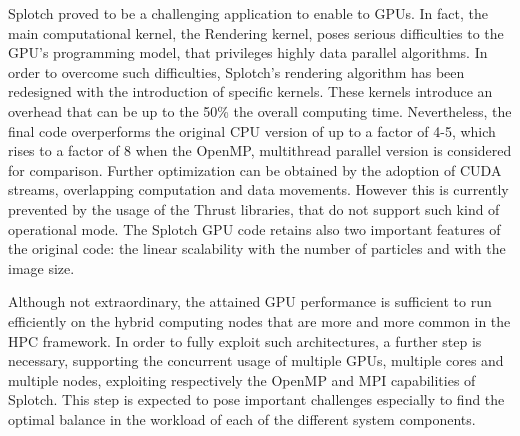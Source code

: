 \documentclass[1p]{elsarticle}
\begin{document}
Splotch proved to be a challenging application to enable to GPUs. 
In fact, the main computational kernel, the Rendering kernel, poses serious difficulties
to the GPU's programming model, that privileges highly data parallel algorithms.
In order to overcome such difficulties, Splotch's rendering algorithm has been
redesigned with the introduction of specific kernels. These kernels 
introduce an overhead that can be up to the 50\% the overall computing
time. Nevertheless, the final code overperforms the original CPU
version of up to a factor of 4-5, which rises to a factor of 8 when the OpenMP,
multithread parallel version is considered for comparison. Further optimization can
be obtained by the adoption of CUDA streams, overlapping computation 
and data movements. However this is currently prevented by the usage of the 
Thrust libraries, that do not support such kind of operational mode. 
The Splotch GPU code retains also two important features of the original
code: the linear scalability with the number of particles and with the 
image size. 

Although not extraordinary, the attained GPU performance is sufficient 
to run efficiently on the hybrid computing nodes that are more and 
more common in the HPC framework. In order to fully exploit such architectures, 
a further step is necessary, supporting the concurrent usage of 
multiple GPUs, multiple cores and multiple nodes, exploiting respectively the OpenMP and
MPI capabilities of Splotch. This step is expected to pose important 
challenges especially to find the optimal balance in the workload of each of the different 
system components.



	
\end{document}
